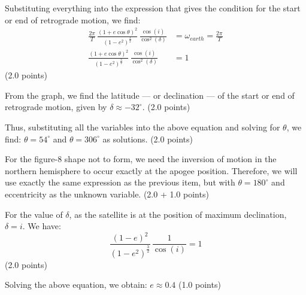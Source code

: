 \begin{description}
  Substituting everything into the expression that gives the condition for the
  start or end of retrograde motion, we find:
  \begin{align*}
    \frac{2\pi}{T}\,
      \frac{(1 + e\cos\theta)^2}{(1 - e^2)^{\frac{3}{2}}}\,
      \frac{\cos(i)}{\cos^2(\delta)}
      &= \omega_{earth} = \frac{2\pi}{T} \\
    \frac{(1 + e\cos\theta)^2}{(1 - e^2)^{\frac{3}{2}}}\,
      \frac{\cos(i)}{\cos^2(\delta)} &= 1
  \end{align*}
  \hfill(2.0 points)

  From the graph, we find the latitude --- or declination --- of the start or
  end of retrograde motion, given by $\delta \approx -32^\circ$.
  \hfill(2.0 points)

  Thus, substituting all the variables into the above equation and solving for
  $\theta$, we find: $\boxed{\theta = 54^\circ}$ and
  $\boxed{\theta = 306^\circ}$ as solutions. \hfill(2.0 points)

\item[(j)] For the figure-8 shape not to form, we need the inversion of motion
  in the northern hemisphere to occur exactly at the apogee position.
  Therefore, we will use exactly the same expression as the previous item, but
  with $\theta = 180^\circ$ and eccentricity as the unknown variable.
  \hfill(2.0 + 1.0 points)

  For the value of $\delta$, as the satellite is at the position of maximum
  declination, $\delta = i$. We have:
  \[
    \frac{(1 - e)^2}{(1 - e^2)^{\frac{3}{2}}}\,\frac{1}{\cos(i)} = 1
  \]
  \hfill(2.0 points)

  Solving the above equation, we obtain: $\boxed{e \approx 0.4}$
  \hfill(1.0 points)
\end{description}
